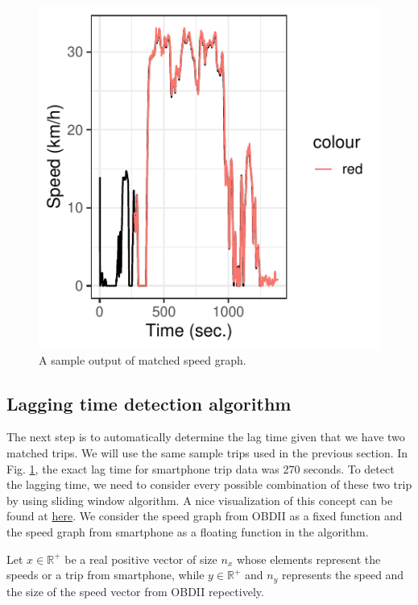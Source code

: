 \documentclass[letterpaper,9pt,twocolumn,twoside,]{pinp}
\begin{document}
\begin{figure}

{\centering \includegraphics{report_issaclee_files/figure-latex/speedplot-1} 

}

\caption{A sample output of matched speed graph.}\label{fig:speedplot}
\end{figure}

\hypertarget{lagging-time-detection-algorithm}{%
\subsection{Lagging time detection
algorithm}\label{lagging-time-detection-algorithm}}

The next step is to automatically determine the lag time given that we
have two matched trips. We will use the same sample trips used in the
previous section. In Fig. \ref{fig:speedplot}, the exact lag time for
smartphone trip data was 270 seconds. To detect the lagging time, we
need to consider every possible combination of these two trip by using
sliding window algorithm. A nice visualization of this concept can be
found at
\href{https://en.wikipedia.org/wiki/Convolution\#/media/File:Convolution_of_spiky_function_with_box2.gif}{here}.
We consider the speed graph from OBDII as a fixed function and the speed
graph from smartphone as a floating function in the algorithm.

Let \(x \in \mathbb{R^+}\) be a real positive vector of size \(n_x\)
whose elements represent the speeds or a trip from smartphone, while
\(y \in \mathbb{R^+}\) and \(n_y\) represents the speed and the size of
the speed vector from OBDII repectively.
\end{document}
